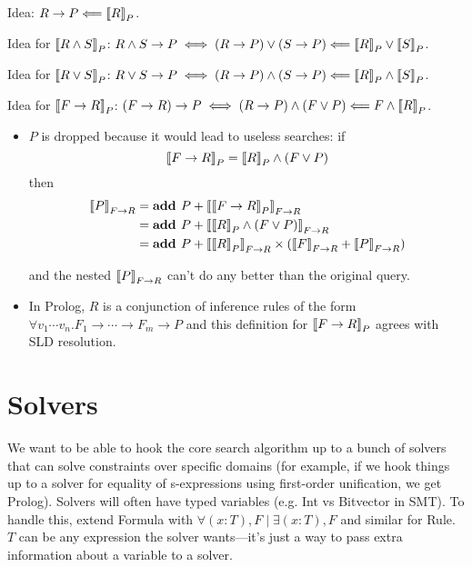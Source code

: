 \documentclass[10pt]{article}
\begin{document}
\noindent Idea: $R\to P\Longleftarrow\left\llbracket R\right\rrbracket_P$.

\noindent Idea for $\left\llbracket R\land S\right\rrbracket_P$: $R\land S\to P \iff (R\to P)\lor(S\to P)
  \Longleftarrow\left\llbracket R\right\rrbracket_P\lor \left\llbracket S\right\rrbracket_P$.

\noindent Idea for $\left\llbracket R\lor S\right\rrbracket_P$: $R\lor S\to P \iff (R\to P)\land(S\to P)
  \Longleftarrow\left\llbracket R\right\rrbracket_P\land \left\llbracket S\right\rrbracket_P$.

\noindent Idea for $\left\llbracket F\to R\right\rrbracket_P$:
  $(F\to R)\to P \iff (R\to P)\land (F\lor P)
    \Longleftarrow F\land \left\llbracket R\right\rrbracket_P$. \begin{itemize}
\newcommand{\searchto}[1]{\searchwith{F\to R}{#1}}
\item $P$ is dropped because it would lead to useless searches:
  if \[\left\llbracket F\to R\right\rrbracket_P = \left\llbracket R\right\rrbracket_P\land(F\lor P)\] then \begin{align*}
  \searchto P
    &= \assert P + \searchto{\ccrule{F\to R}} \\
    &= \assert P + \searchto{\ccrule R\land (F\lor P)} \\
    &= \assert P + \searchto{\ccrule R}\times(\searchto F + \searchto P) \\
\end{align*}

\noindent and the nested $\searchto P$ can't do any better than the original query.

\item In Prolog, $R$ is a conjunction of inference rules of the form
  $\forall  v_1\cdots v_n.  F_1\to\cdots\to F_m\to P$ and this definition
  for $\left\llbracket F\to R\right\rrbracket_P$ agrees with SLD resolution.

\end{itemize}

\section*{Solvers}

We want to be able to hook the core search algorithm up to a bunch of 
solvers that can solve constraints over specific domains
(for example, if we hook things up to a solver for equality of
s-expressions using first-order unification, we get Prolog).
Solvers will often have typed variables (e.g. Int vs Bitvector in SMT).
To handle this, extend Formula with $\forall (x:T), F\mid\exists (x:T), F$
and similar for Rule. $T$ can be any expression the solver wants---it's just
a way to pass extra information about a variable to a solver.
\\
\end{document}

